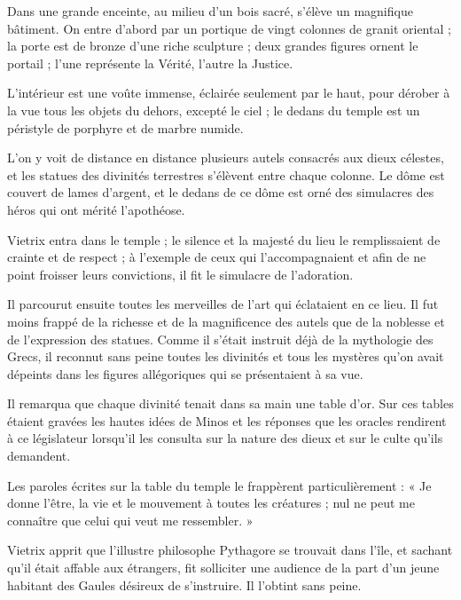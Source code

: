 \documentclass[a4paper, 11pt, oneside, polutonikogreek, french]{article}
\begin{document}
Dans une grande enceinte, au milieu d'un bois sacré, s'élève un magnifique bâtiment. On entre d'abord par un portique de vingt colonnes de granit oriental ; la porte est de bronze d'une riche sculpture ; deux grandes figures ornent le portail ; l'une représente la Vérité, l'autre la Justice.

L'intérieur est une voûte immense, éclairée seulement par le haut, pour dérober à la vue tous les objets du dehors, excepté le ciel ; le dedans du temple est un péristyle de porphyre et de marbre numide.

L'on y voit de distance en distance plusieurs autels consacrés aux dieux célestes, et les statues des divinités terrestres s'élèvent entre chaque colonne. Le dôme est couvert de lames d'argent, et le dedans de ce dôme est orné des simulacres des héros qui ont mérité l'apothéose.

Vietrix entra dans le temple ; le silence et la majesté du lieu le remplissaient de crainte et de respect ; à l'exemple de ceux qui l'accompagnaient et afin de ne point froisser leurs convictions, il fit le simulacre de l'adoration.

Il parcourut ensuite toutes les merveilles de l'art qui éclataient en ce lieu. Il fut moins frappé de la richesse et de la magnificence des autels que de la noblesse et de l'expression des statues. Comme il s'était instruit déjà de la mythologie des Grecs, il reconnut sans peine toutes les divinités et tous les mystères qu'on avait dépeints dans les figures allégoriques qui se présentaient à sa vue.

Il remarqua que chaque divinité tenait dans sa main une table d'or. Sur ces tables étaient gravées les hautes idées de Minos et les réponses que les oracles rendirent à ce législateur lorsqu'il les consulta sur la nature des dieux et sur le culte qu'ils demandent.

Les paroles écrites sur la table du temple le frappèrent particulièrement : « Je donne l'être, la vie et le mouvement à toutes les créatures ; nul ne peut me connaître que celui qui veut me ressembler. »

\bigskip
\centerline{\EightStarTaper}
\centerline{\EightStarTaper\EightStarTaper}
\bigskip

Vietrix apprit que l'illustre philosophe Pythagore se trouvait dans l'île, et sachant qu'il était affable aux étrangers, fit solliciter une audience de la part d'un jeune habitant des Gaules désireux de s'instruire. Il l'obtint sans peine.

\bigskip
\centerline{\EightStarTaper}
\centerline{\EightStarTaper\EightStarTaper}
\bigskip
\end{document}
